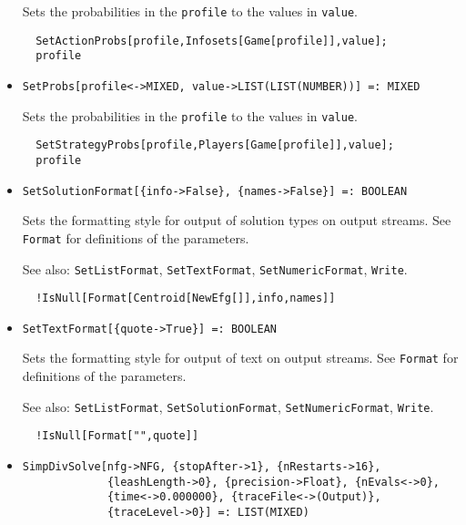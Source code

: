 \begin{itemize}
\bd 
Sets the probabilities in the \verb+profile+ to the values in
\verb+value+.  
\begin{verbatim}
  SetActionProbs[profile,Infosets[Game[profile]],value];
  profile
\end{verbatim} 
\ed

\item{}
\protect \large \begin{verbatim}
SetProbs[profile<->MIXED, value->LIST(LIST(NUMBER))] =: MIXED 
\end{verbatim}\normalsize

\bd 
Sets the probabilities in the \verb+profile+ to the values in
\verb+value+.  
\begin{verbatim}
  SetStrategyProbs[profile,Players[Game[profile]],value];
  profile
\end{verbatim} 
\ed

\item{}
\protect \large \begin{verbatim}
SetSolutionFormat[{info->False}, {names->False}] =: BOOLEAN 
\end{verbatim}\normalsize

\bd Sets the formatting style for output of solution types on output
streams.  See \verb+Format+ for definitions of the parameters.
\item [See also:] \verb+SetListFormat+, \verb+SetTextFormat+, 
\verb+SetNumericFormat+, \verb+Write+.
\begin{verbatim}
  !IsNull[Format[Centroid[NewEfg[]],info,names]]
\end{verbatim} 
\ed

\item{}
\protect \large \begin{verbatim}
SetTextFormat[{quote->True}] =: BOOLEAN 
\end{verbatim}\normalsize

\bd 
Sets the formatting style for output of text on output streams.
See \verb+Format+ for definitions of the parameters.
\item [See also:] \verb+SetListFormat+, \verb+SetSolutionFormat+, 
\verb+SetNumericFormat+, \verb+Write+.
\begin{verbatim}
  !IsNull[Format["",quote]]
\end{verbatim} 
\ed

\item{}
\protect \large \begin{verbatim}
SimpDivSolve[nfg->NFG, {stopAfter->1}, {nRestarts->16}, 
             {leashLength->0}, {precision->Float}, {nEvals<->0}, 
             {time<->0.000000}, {traceFile<->(Output)}, 
             {traceLevel->0}] =: LIST(MIXED) 
\end{verbatim}\normalsize


\end{itemize}
